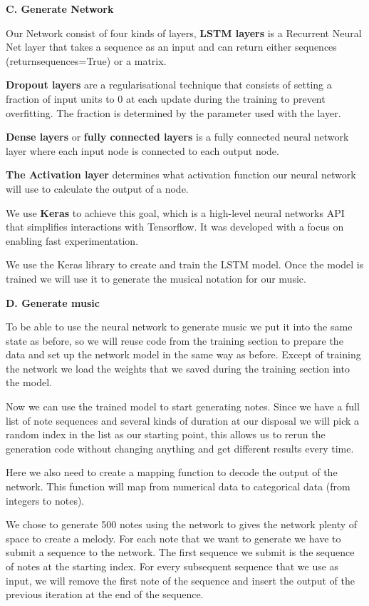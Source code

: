 \documentclass[10pt,twocolumn,letterpaper]{article}
\begin{document}
\noindent
\textbf{C. Generate Network}

Our Network consist of four kinds of layers, 
\textbf{LSTM layers} is a Recurrent Neural Net layer that takes a sequence as an input and can return either sequences (return\textunderscore sequences=True) or a matrix.

\textbf{Dropout layers} are a regularisational technique that consists of setting a fraction of input units to 0 at each update during the training to prevent overfitting. The fraction is determined by the parameter used with the layer.

\textbf{Dense layers} or \textbf{fully connected layers} is a fully connected neural network layer where each input node is connected to each output node.

\textbf{The Activation layer} determines what activation function our neural network will use to calculate the output of a node.

We use \textbf{Keras} to achieve this goal, which is a high-level neural networks API that simplifies interactions with Tensorflow. It was developed with a focus on enabling fast experimentation.

We use the Keras library to create and train the LSTM model. Once the model is trained we will use it to generate the musical notation for our music.

\noindent
\textbf{D. Generate music}

To be able to use the neural network to generate music we put it into the same state as before, so we will reuse code from the training section to prepare the data and set up the network model in the same way as before. Except of training the network we load the weights that we saved during the training section into the model. 

Now we can use the trained model to start generating notes. Since we have a full list of note sequences and several kinds of duration at our disposal we will pick a random index in the list as our starting point, this allows us to rerun the generation code without changing anything and get different results every time. 

Here we also need to create a mapping function to decode the output of the network. This function will map from numerical data to categorical data (from integers to notes).

We chose to generate 500 notes using the network to gives the network plenty of space to create a melody. For each note that we want to generate we have to submit a sequence to the network. The first sequence we submit is the sequence of notes at the starting index. For every subsequent sequence that we use as input, we will remove the first note of the sequence and insert the output of the previous iteration at the end of the sequence.
\end{document}
